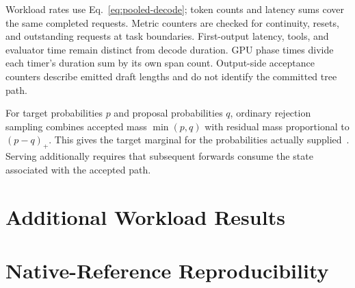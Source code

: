 \documentclass[conference]{IEEEtran}
\begin{document}
Workload rates use Eq.~\ref{eq:pooled-decode}; token counts and latency sums cover the same completed requests. Metric counters are checked for continuity, resets, and outstanding requests at task boundaries. First-output latency, tools, and evaluator time remain distinct from decode duration. GPU phase times divide each timer's duration sum by its own span count. Output-side acceptance counters describe emitted draft lengths and do not identify the committed tree path.

For target probabilities $p$ and proposal probabilities $q$, ordinary rejection sampling combines accepted mass $\min(p,q)$ with residual mass proportional to $(p-q)_+$. This gives the target marginal for the probabilities actually supplied~\cite{leviathan2023fast,chen2023sampling}. Serving additionally requires that subsequent forwards consume the state associated with the accepted path.

\section{Additional Workload Results}
\label{app:workload}


\section{Native-Reference Reproducibility}
\label{app:native-reference}


\FloatBarrier
\label{ReferencesStart}
\IEEEtriggercmd{\newpage}


\end{document}
